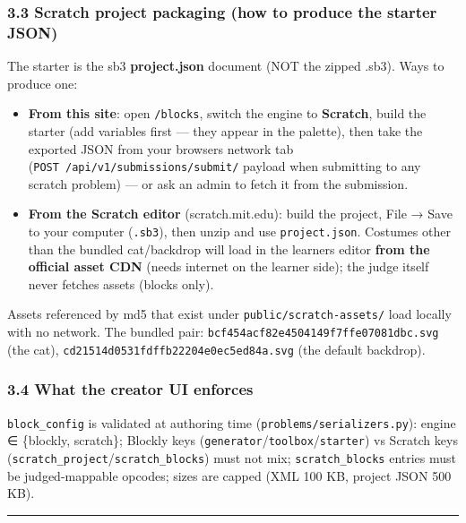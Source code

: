 \documentclass[
]{article}
\providecommand{\tightlist}{%
  \setlength{\itemsep}{0pt}\setlength{\parskip}{0pt}}
\begin{document}
\subsubsection{3.3 Scratch project packaging (how to produce the starter
JSON)}\label{33-scratch-project-packaging-how-to-produce-the-starter-json}

The starter is the sb3 \textbf{project.json} document (NOT the zipped
.sb3). Ways to produce one:

\begin{itemize}
\tightlist
\item
  \textbf{From this site}: open \texttt{/blocks}, switch the engine to
  \textbf{Scratch}, build the starter (add variables first --- they
  appear in the palette), then take the exported JSON from your
  browser\textquotesingle s network tab
  (\texttt{POST\ /api/v1/submissions/submit/} payload when submitting to
  any scratch problem) --- or ask an admin to fetch it from the
  submission.
\item
  \textbf{From the Scratch editor} (scratch.mit.edu): build the project,
  File → Save to your computer (\texttt{.sb3}), then unzip and use
  \texttt{project.json}. Costumes other than the bundled cat/backdrop
  will load in the learner\textquotesingle s editor \textbf{from the
  official asset CDN} (needs internet on the learner side); the judge
  itself never fetches assets (blocks only).
\end{itemize}

Assets referenced by md5 that exist under
\texttt{public/scratch-assets/} load locally with no network. The
bundled pair: \texttt{bcf454acf82e4504149f7ffe07081dbc.svg} (the cat),
\texttt{cd21514d0531fdffb22204e0ec5ed84a.svg} (the default backdrop).

\subsubsection{3.4 What the creator UI
enforces}\label{34-what-the-creator-ui-enforces}

\texttt{block\_config} is validated at authoring time
(\texttt{problems/serializers.py}): engine ∈ \{blockly, scratch\};
Blockly keys (\texttt{generator}/\texttt{toolbox}/\texttt{starter}) vs
Scratch keys (\texttt{scratch\_project}/\texttt{scratch\_blocks}) must
not mix; \texttt{scratch\_blocks} entries must be judged-mappable
opcodes; sizes are capped (XML 100 KB, project JSON 500 KB).

\begin{center}\rule{0.5\linewidth}{0.5pt}\end{center}
\end{document}
